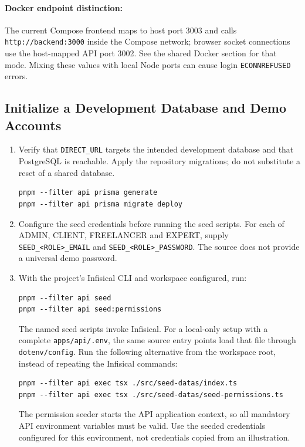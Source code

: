 \paragraph{Docker endpoint distinction:} The current Compose frontend maps to host port 3003 and calls \texttt{http://backend:3000} inside the Compose network; browser socket connections use the host-mapped API port 3002. See the shared Docker section for that mode. Mixing these values with local Node ports can cause login \texttt{ECONNREFUSED} errors.

\subsection{Initialize a Development Database and Demo Accounts}
\begin{enumerate}[leftmargin=1.8em,itemsep=3pt]
\item Verify that \texttt{DIRECT\_URL} targets the intended development database and that PostgreSQL is reachable. Apply the repository migrations; do not substitute a reset of a shared database.
\begin{lstlisting}[frame=single,backgroundcolor=\color{codebg}]
pnpm --filter api prisma generate
pnpm --filter api prisma migrate deploy
\end{lstlisting}
\item Configure the seed credentials before running the seed scripts. For each of ADMIN, CLIENT, FREELANCER and EXPERT, supply \texttt{SEED\_<ROLE>\_EMAIL} and \texttt{SEED\_<ROLE>\_PASSWORD}. The source does not provide a universal demo password.
\item With the project's Infisical CLI and workspace configured, run:
\begin{lstlisting}[frame=single,backgroundcolor=\color{codebg}]
pnpm --filter api seed
pnpm --filter api seed:permissions
\end{lstlisting}
The named seed scripts invoke Infisical. For a local-only setup with a complete \nolinkurl{apps/api/.env}, the same source entry points load that file through \texttt{dotenv/config}. Run the following alternative from the workspace root, instead of repeating the Infisical commands:
\begin{lstlisting}[frame=single,backgroundcolor=\color{codebg}]
pnpm --filter api exec tsx ./src/seed-datas/index.ts
pnpm --filter api exec tsx ./src/seed-datas/seed-permissions.ts
\end{lstlisting}
The permission seeder starts the API application context, so all mandatory API environment variables must be valid. Use the seeded credentials configured for this environment, not credentials copied from an illustration.

\end{enumerate}
